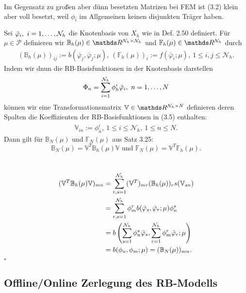 Im Gegensatz zu großen aber dünn besetzten Matrizen bei FEM ist (3.2) klein aber voll besetzt, weil $\phi_i$ im Allgemeinen keinen disjunkten Träger haben.

Sei $\bar{\varphi}_i,~i=1, \dots ,\mathcal{N}_h$ die Knotenbasis von $X_h$ wie in Def. 2.50 definiert.
Für $\mu\in \mathcal{P}$ definieren wir $\mathbb{B}_h(\mu)\in \R^{\mathcal{N}_h\times \mathcal{N}_h}$ und $\mathbb{F}_h(\mu)\in \R^{\mathcal{N}_h}$ durch
\begin{align}
(\mathbb{B}_h(\mu))_{ij} := b(\bar{\varphi}_j,\bar{\varphi}_j;\mu),~ (\mathbb{F}_h(\mu))_i := f(\bar{\varphi}_i;\mu),~1\le i,j\le \mathcal{N}_h.
\end{align}
Indem wir dnun die RB-Basisfunktionen in der Knotenbasis darstellen
\begin{align}
\Phi_n = \sum_{i=1}^{\mathcal{N}_h} \phi_h^i\bar{\varphi}_i,~n=1, \dots ,N
\end{align}
können wir eine Transformationsmatrix $\mathbb{V}\in \R^{\mathcal{N}_h\times N}$ definieren deren Spalten die Koeffizienten der RB-Basisfunktionen in (3.5) enthalten:
\begin{align}
\mathbb{V}_{in} := \phi_n^i,~1\le i\le \mathcal{N}_h,~1\le n\le N.
\end{align}
Dann gilt für $\mathbb{B}_N(\mu)$ und $\mathbb{F}_N(\mu)$ aus Satz 3.25:
\[
\mathbb{B}_N(\mu)= \mathbb{V}^T\mathbb{B}_h(\mu)\mathbb{V} \text{ und } \mathbb{F}_N(\mu) = \mathbb{V}^T\mathbb{F}_h(\mu).
\]

\\
\begin{align*}
(\mathbb{V}^T\mathbb{B}_h(\mu)\mathbb{V})_{mn} &= \sum_{r,s=1}^{\mathcal{N}_h} (\mathbb{V}^T)_{mr} (\mathbb{B}_h(\mu))_rs (\mathbb{V}_{sn})\\
&= \sum_{r,s=1}^{\mathcal{N}_h} \phi_m^r b(\bar{\varphi}_s,\bar{\varphi}_r;\mu) \phi_n^s\\
&= b\left( \sum_{s=1}^{\mathcal{N}_h}\phi_n^s \bar{\varphi}_s,\sum_{r=1}^{\mathcal{N}_h}\phi_m^r \bar{\varphi}_r;\mu\right)\\
&= b(\phi_n,\phi_m;\mu) = (\mathbb{B}_N(\mu))_{mn}.
\end{align*}
\hfill $\square$

\subsection{Offline/Online Zerlegung des RB-Modells}

